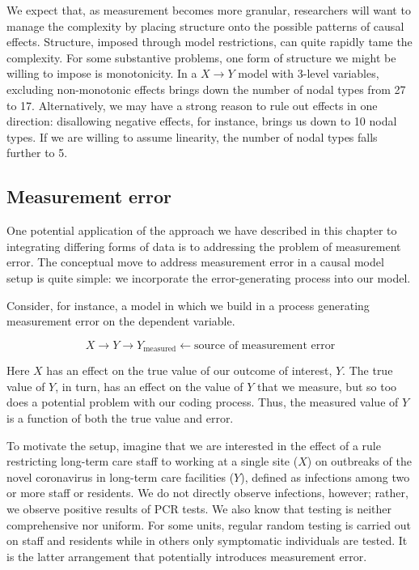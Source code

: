\documentclass[
  12pt,
]{book}
\begin{document}
We expect that, as measurement becomes more granular, researchers will want to manage the complexity by placing structure onto the possible patterns of causal effects. Structure, imposed through model restrictions, can quite rapidly tame the complexity. For some substantive problems, one form of structure we might be willing to impose is monotonicity. In a \(X \rightarrow Y\) model with 3-level variables, excluding non-monotonic effects brings down the number of nodal types from 27 to 17. Alternatively, we may have a strong reason to rule out effects in one direction: disallowing negative effects, for instance, brings us down to 10 nodal types. If we are willing to assume linearity, the number of nodal types falls further to 5.

\hypertarget{measurement-error}{%
\subsection{Measurement error}\label{measurement-error}}

One potential application of the approach we have described in this chapter to integrating differing forms of data is to addressing the problem of measurement error. The conceptual move to address measurement error in a causal model setup is quite simple: we incorporate the error-generating process into our model.

Consider, for instance, a model in which we build in a process generating measurement error on the dependent variable.

\[X \rightarrow Y  \rightarrow Y_\text{measured} \leftarrow \text{source of measurement error}\]

Here \(X\) has an effect on the true value of our outcome of interest, \(Y\). The true value of \(Y\), in turn, has an effect on the value of \(Y\) that we measure, but so too does a potential problem with our coding process. Thus, the measured value of \(Y\) is a function of both the true value and error.

To motivate the setup, imagine that we are interested in the effect of a rule restricting long-term care staff to working at a single site (\(X\)) on outbreaks of the novel coronavirus in long-term care facilities (\(Y\)), defined as infections among two or more staff or residents. We do not directly observe infections, however; rather, we observe positive results of PCR tests. We also know that testing is neither comprehensive nor uniform. For some units, regular random testing is carried out on staff and residents while in others only symptomatic individuals are tested. It is the latter arrangement that potentially introduces measurement error.
\end{document}
